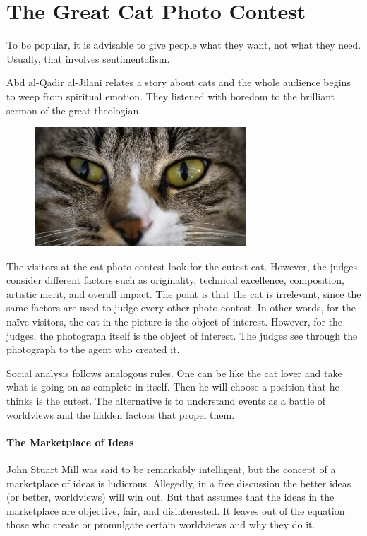 \section{The Great Cat Photo Contest}

\begin{quotex}
To be popular, it is advisable to give people what they want, not what they need. Usually, that involves sentimentalism.

Abd al-Qadir al-Jilani relates a story about cats and the whole audience begins to weep from spiritual emotion. They listened with boredom to the brilliant sermon of the great theologian. 

\end{quotex}

\begin{figure}
 \includegraphics[scale=.5]{a20140814TheGreatCatPhotoContest-img001.jpg} 
\end{figure}

The visitors at the cat photo contest look for the cutest cat. However, the judges consider different factors such as originality, technical excellence, composition, artistic merit, and overall impact. The point is that the cat is irrelevant, since the same factors are used to judge every other photo contest. In other words, for the naïve visitors, the cat in the picture is the object of interest. However, for the judges, the photograph itself is the object of interest. The judges see through the photograph to the agent who created it.

Social analysis follows analogous rules. One can be like the cat lover and take what is going on as complete in itself. Then he will choose a position that he thinks is the cutest. The alternative is to understand events as a battle of worldviews and the hidden factors that propel them.

\paragraph{The Marketplace of Ideas}
John Stuart Mill was said to be remarkably intelligent, but the concept of a marketplace of ideas is ludicrous. Allegedly, in a free discussion the better ideas (or better, worldviews) will win out. But that assumes that the ideas in the marketplace are objective, fair, and disinterested. It leaves out of the equation those who create or promulgate certain worldviews and why they do it.

